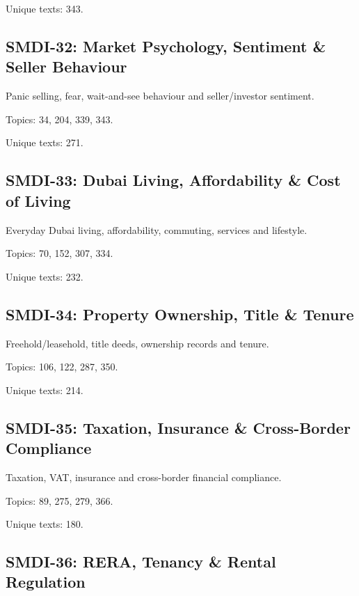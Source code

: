 \documentclass[10pt]{article}
\begin{document}
\par Unique texts: 343.

\subsection*{SMDI-32: Market Psychology, Sentiment \& Seller Behaviour}

Panic selling, fear, wait-and-see behaviour and seller/investor sentiment.

\par Topics: 34, 204, 339, 343.

\par Unique texts: 271.

\subsection*{SMDI-33: Dubai Living, Affordability \& Cost of Living}

Everyday Dubai living, affordability, commuting, services and lifestyle.

\par Topics: 70, 152, 307, 334.

\par Unique texts: 232.

\subsection*{SMDI-34: Property Ownership, Title \& Tenure}

Freehold/leasehold, title deeds, ownership records and tenure.

\par Topics: 106, 122, 287, 350.

\par Unique texts: 214.

\subsection*{SMDI-35: Taxation, Insurance \& Cross-Border Compliance}

Taxation, VAT, insurance and cross-border financial compliance.

\par Topics: 89, 275, 279, 366.

\par Unique texts: 180.

\subsection*{SMDI-36: RERA, Tenancy \& Rental Regulation}
\end{document}
